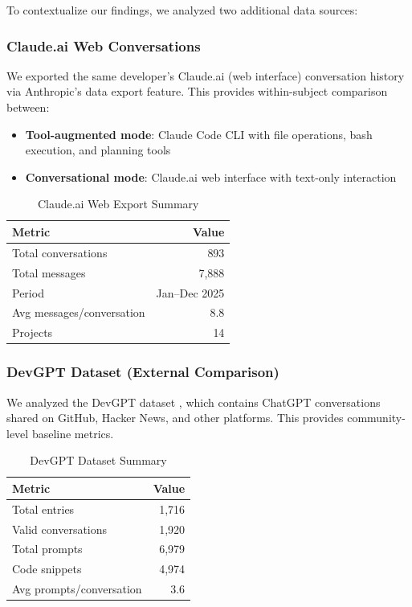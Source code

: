 \documentclass{ntlabs-preprint}
\begin{document}
To contextualize our findings, we analyzed two additional data sources:

\subsubsection{Claude.ai Web Conversations}

We exported the same developer's Claude.ai (web interface) conversation history via Anthropic's data export feature. This provides within-subject comparison between:
\begin{itemize}
    \item \textbf{Tool-augmented mode}: Claude Code CLI with file operations, bash execution, and planning tools
    \item \textbf{Conversational mode}: Claude.ai web interface with text-only interaction
\end{itemize}

\begin{table}[h]
\centering
\caption{Claude.ai Web Export Summary}
\label{tab:web}
\begin{tabular}{lr}
\toprule
\textbf{Metric} & \textbf{Value} \\
\midrule
Total conversations & 893 \\
Total messages & 7,888 \\
Period & Jan--Dec 2025 \\
Avg messages/conversation & 8.8 \\
Projects & 14 \\
\bottomrule
\end{tabular}
\end{table}

\subsubsection{DevGPT Dataset (External Comparison)}

We analyzed the DevGPT dataset \citep{tao2024devgpt}, which contains ChatGPT conversations shared on GitHub, Hacker News, and other platforms. This provides community-level baseline metrics.

\begin{table}[h]
\centering
\caption{DevGPT Dataset Summary}
\label{tab:devgpt}
\begin{tabular}{lr}
\toprule
\textbf{Metric} & \textbf{Value} \\
\midrule
Total entries & 1,716 \\
Valid conversations & 1,920 \\
Total prompts & 6,979 \\
Code snippets & 4,974 \\
Avg prompts/conversation & 3.6 \\
\bottomrule
\end{tabular}
\end{table}
\end{document}
